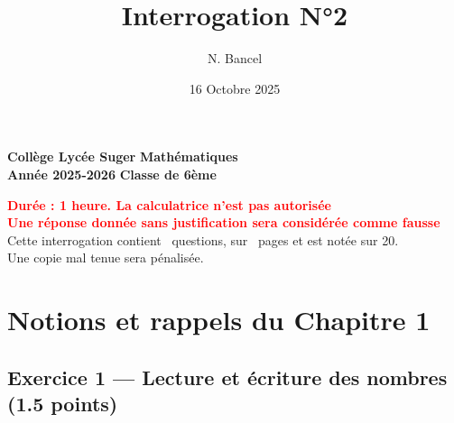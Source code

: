 \documentclass[answers]{exam}
\title{Interrogation N°2}
\author{N. Bancel}
\date{16 Octobre 2025}
\begin{document}
\textbf{Collège Lycée Suger}
\hfill
\textbf{Mathématiques} \\

\textbf{Année 2025-2026}
\hfill
\textbf{Classe de 6ème} \par

{\let\newpage\relax\maketitle}

\begin{center}
\textbf{\textcolor{red}{Durée : 1 heure. La calculatrice n'est pas autorisée}} \\
\textbf{\textcolor{red}{Une réponse donnée sans justification sera considérée comme fausse}} \\
Cette interrogation contient \numquestions\ questions, sur \numpages\ pages et est notée sur 20. \\
Une copie mal tenue sera pénalisée.

\end{center}

\section*{Notions et rappels du Chapitre 1}

\subsection*{Exercice 1 — Lecture et écriture des nombres (1.5 points)}
\end{document}
